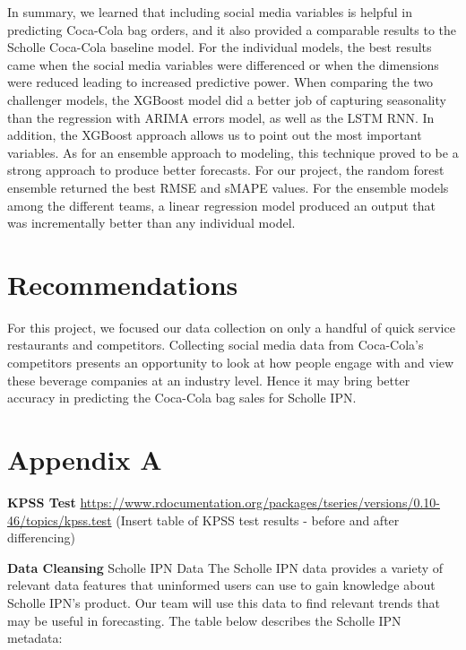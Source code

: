 \documentclass[12pt,oneside]{chicagocapstone}
\begin{document}
In summary, we learned that including social media variables is helpful in predicting Coca-Cola bag orders, and it also provided a comparable results to the Scholle Coca-Cola baseline model. For the individual models, the best results came when the social media variables were differenced or when the dimensions were reduced leading to increased predictive power. When comparing the two challenger models, the XGBoost model did a better job of capturing seasonality than the regression with ARIMA errors model, as well as the LSTM RNN. In addition, the XGBoost approach allows us to point out the most important variables.
As for an ensemble approach to modeling, this technique proved to be a strong approach to produce better forecasts. For our project, the random forest ensemble returned the best RMSE and sMAPE values. For the ensemble models among the different teams, a linear regression model produced an output that was incrementally better than any individual model.

\hypertarget{recommendations}{%
\chapter*{Recommendations}\label{recommendations}}

For this project, we focused our data collection on only a handful of quick service restaurants and competitors. Collecting social media data from Coca-Cola's competitors presents an opportunity to look at how people engage with and view these beverage companies at an industry level. Hence it may bring better accuracy in predicting the Coca-Cola bag sales for Scholle IPN.

\newpage

\appendix

\hypertarget{appendix}{%
\chapter*{Appendix A}\label{appendix}}

\textbf{KPSS Test}
\url{https://www.rdocumentation.org/packages/tseries/versions/0.10-46/topics/kpss.test}
(Insert table of KPSS test results - before and after differencing)

\textbf{Data Cleansing}
Scholle IPN Data
The Scholle IPN data provides a variety of relevant data features that uninformed users can use to gain knowledge about Scholle IPN's product. Our team will use this data to find relevant trends that may be useful in forecasting. The table below describes the Scholle IPN metadata:
\end{document}
